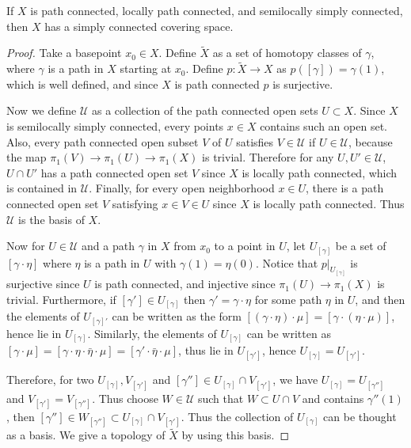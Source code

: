 \begin{prop} If $X$ is path connected, locally path connected, and semilocally simply connected, then $X$ has a simply connected covering space.
\end{prop}
\begin{proof} Take a basepoint $x_0\in X$. Define $\tilde{X}$ as a set of homotopy classes of $\gamma$, where $\gamma$ is a path in $X$ starting at $x_0$. Define $p:\tilde{X}\rightarrow X$ as $p([\gamma])=\gamma(1)$, which is well defined, and since $X$ is path connected $p$ is surjective.

Now we define $\mathcal{U}$ as a collection of the path connected open sets $U\subset X$. Since $X$ is semilocally simply connected, every points $x\in X$ contains such an open set. Also, every path connected open subset $V$ of $U$ satisfies $V\in \mathcal{U}$ if $U\in\mathcal{U}$, because the map $\pi_1(V)\rightarrow \pi_1(U)\rightarrow \pi_1(X)$ is trivial. Therefore for any $U,U'\in \mathcal{U}$, $U\cap U'$ has a path connected open set $V$ since $X$ is locally path connected, which is contained in $\mathcal{U}$. Finally, for every open neighborhood $x\in U$, there is a path connected open set $V$ satisfying $x\in V\in U$ since $X$ is locally path connected. Thus $\mathcal{U}$ is the basis of $X$.

Now for $U\in \mathcal{U}$ and a path $\gamma$ in $X$ from $x_0$ to a point in $U$, let $U_{[\gamma]}$ be a set of $[\gamma\cdot \eta]$ where $\eta$ is a path in $U$ with $\gamma(1)=\eta(0)$. Notice that $p|_{U_{[\gamma]}}$ is surjective since $U$ is path connected, and injective since $\pi_1(U)\rightarrow \pi_1(X)$ is trivial. Furthermore, if $[\gamma']\in U_{[\gamma]}$ then $\gamma'=\gamma\cdot \eta$ for some path $\eta$ in $U$, and then the elements of $U_{[\gamma]'}$ can be written as the form $[(\gamma\cdot \eta)\cdot \mu]=[\gamma\cdot(\eta\cdot \mu)]$, hence lie in $U_{[\gamma]}$. Similarly, the elements of $U_{[\gamma]}$ can be written as $[\gamma\cdot \mu]=[\gamma\cdot \eta\cdot \bar{\eta}\cdot \mu]=[\gamma'\cdot \bar{\eta}\cdot \mu]$, thus lie in $U_{[\gamma']}$, hence $U_{[\gamma]}=U_{[\gamma']}$.

Therefore, for two $U_{[\gamma]},V_{[\gamma']}$ and $[\gamma'']\in U_{[\gamma]}\cap V_{[\gamma']}$, we have $U_{[\gamma]}=U_{[\gamma'']}$ and $V_{[\gamma']}=V_{[\gamma'']}$. Thus choose $W\in \mathcal{U}$ such that $W\subset U\cap V$ and contains $\gamma''(1)$, then $[\gamma'']\in W_{[\gamma'']}\subset U_{[\gamma]}\cap V_{[\gamma']}$. Thus the collection of $U_{[\gamma]}$ can be thought as a basis. We give a topology of $\tilde{X}$ by using this basis.


\end{proof}
